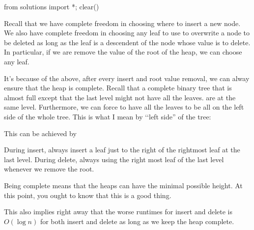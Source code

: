 \begin{python0}
from solutions import *; clear()
\end{python0}

Recall that we have complete freedom in choosing where to insert a new node.
We also have complete freedom in choosing any leaf to use to overwrite
a node to be deleted as long as the leaf is a descendent of the node whose
value is to delete.
In particular, if we are remove the value of the root of the heap,
we can choose any leaf.

It's because of the above,
after every insert and root value removal,
we can alway ensure that the heap is complete.
Recall that a complete binary tree that is almost full except that the
last level might not have all the leaves.
are at the same level.
Furthermore, we can force to have
all the leaves to be all on the left side of the whole
tree.
This is what I mean by \lq\lq left side'' of the tree:



This can be achieved by
\begin{tightlist}
\li During insert, always insert a leaf just to the right of the
rightmost leaf at the last level.
\li During delete, always using the right most leaf of the 
last level whenever we remove the root.
\end{tightlist}










Being complete means that the heaps can have the minimal possible height.
At this point, you ought to know that this is a good thing.

This also implies right away that the worse runtimes for 
insert and delete is $O(\log n)$ for both insert and delete
as long as we keep the heap complete.

